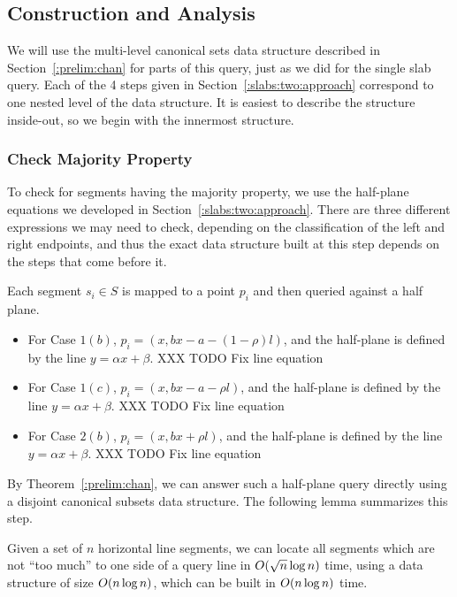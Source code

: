 \subsection{Construction and Analysis}
\label{:slabs:two:analysis}

We will use the multi-level canonical sets data structure described in Section~\ref{:prelim:chan} for parts of this query, just as we did for the single slab query.  Each of the 4 steps given in Section~\ref{:slabs:two:approach} correspond to one nested level of the data structure.  It is easiest to describe the structure inside-out, so we begin with the innermost structure.


\subsubsection{Check Majority Property}

To check for segments having the majority property, we use the half-plane equations we developed in Section~\ref{:slabs:two:approach}.  There are three different expressions we may need to check, depending on the classification of the left and right endpoints, and thus the exact data structure built at this step depends on the steps that come before it.  

Each segment $s_i \in S$ is mapped to a point $p_i$ and then queried against a half plane.
\begin{itemize}
  \item For Case $1(b)$, $p_i = (x, bx - a - (1 - \rho)l)$, and the half-plane is defined by the line $y = \alpha x + \beta$. XXX TODO Fix line equation
  
  \item For Case $1(c)$, $p_i = (x, bx - a - \rho l)$, and the half-plane is defined by the line $y = \alpha x + \beta$. XXX TODO Fix line equation

  \item For Case $2(b)$, $p_i = (x, bx + \rho l)$, and the half-plane is defined by the line $y = \alpha x + \beta$. XXX TODO Fix line equation
\end{itemize}

By Theorem~\ref{:prelim:chan}, we can answer such a half-plane query directly using a disjoint canonical subsets data structure.  The following lemma summarizes this step.

\begin{lemma}
\label{lem:slabs:two:step1}
Given a set of $n$ horizontal line segments, we can locate all segments which are not ``too much'' to one side of a query line in $O\!\left(\sqrt{n}\log{n}\right)$ time, using a data structure of size $O\!\left(n\log{n}\right)$, which can be built in $O\!\left(n\log{n}\right)$ time.
\end{lemma}


